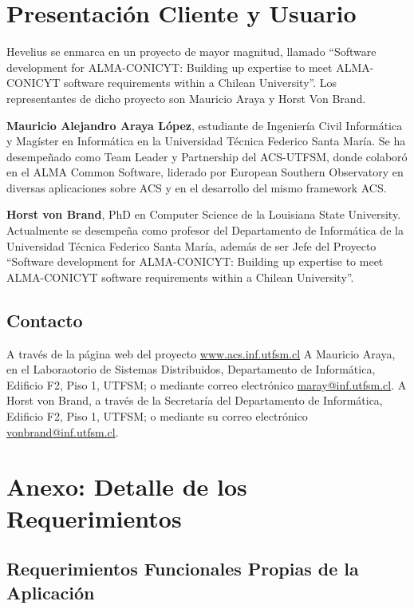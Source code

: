 \documentclass[letterpaper,spanish,10pt]{article}
\begin{document}
\newpage


\section{Presentaci\'on Cliente y Usuario}
Hevelius se enmarca en un proyecto de mayor magnitud, llamado ``Software development for ALMA-CONICYT: Building up expertise to meet ALMA-CONICYT software requirements within a Chilean University''. Los representantes de dicho proyecto son Mauricio Araya y Horst Von Brand.

{\bf Mauricio Alejandro Araya L\'opez}, estudiante de Ingenier\'ia Civil Inform\'atica y Mag\'ister en Inform\'atica en la Universidad T\'ecnica Federico Santa Mar\'ia. Se ha desempe\~nado como Team Leader y Partnership del ACS-UTFSM, donde colabor\'o en el ALMA Common Software, liderado por European Southern Observatory en diversas aplicaciones sobre ACS y en el desarrollo del mismo framework ACS. 

{\bf Horst von Brand}, PhD en Computer Science de la Louisiana State University. Actualmente se desempe\~na como profesor del Departamento de Inform\'atica de la Universidad T\'ecnica Federico Santa Mar\'ia, adem\'as de ser Jefe del Proyecto ``Software development for ALMA-CONICYT: Building up expertise to meet ALMA-CONICYT software requirements within a Chilean University''.



\subsection{Contacto}
A trav\'es de la p\'agina web del proyecto \url{www.acs.inf.utfsm.cl}
A Mauricio Araya, en el Laboraotorio de Sistemas Distribuidos, Departamento de Inform\'atica, Edificio F2, Piso 1, UTFSM; o mediante correo electr\'onico \url{maray@inf.utfsm.cl}.
A Horst von Brand, a trav\'es de la Secretar\'ia del Departamento de Inform\'atica, Edificio F2, Piso 1, UTFSM; o mediante su correo electr\'onico \url{vonbrand@inf.utfsm.cl}.


\newpage


\section{Anexo: Detalle de los Requerimientos}

\subsection{Requerimientos Funcionales Propias de la Aplicaci\'on}
\end{document}
